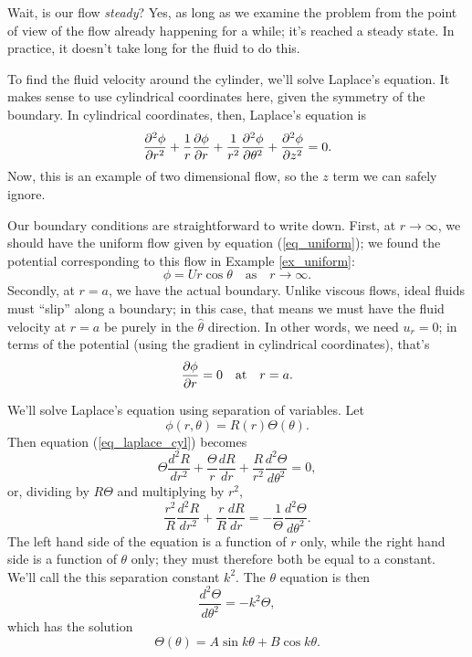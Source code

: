 Wait, is our flow \emph{steady}?  Yes, as long as we examine the problem from the point of view of the flow already happening for a while; it's reached a steady state.  In practice, it doesn't take long for the fluid to do this.

To find the fluid velocity around the cylinder, we'll solve Laplace's equation.  It makes sense to use cylindrical coordinates here, given the symmetry of the boundary.  In cylindrical coordinates, then, Laplace's equation is
\begin{equation}
\label{eq_laplace_cyl}
\frac{\partial^2 {\phi}}{\partial {r}^2} + \frac{1}{r} \frac{\partial {\phi}}{\partial {r}} + \frac{1}{r^2} \frac{\partial^2 {\phi}}{\partial {\theta}^2} + \frac{\partial^2 {\phi}}{\partial {z}^2} = 0.
\end{equation}
Now, this is an example of two dimensional flow, so the $z$ term we can safely ignore.

Our boundary conditions are straightforward to write down.  First, at $r \to \infty$, we should have the uniform flow given by equation (\ref{eq_uniform}); we found the potential corresponding to this flow in Example \ref{ex_uniform}:
\begin{equation}
\label{eq_cyl_bc1}
\phi = Ur \cos \theta \quad  \text{as} \quad r \to \infty.
\end{equation}
Secondly, at $r=a$, we have the actual boundary.  Unlike viscous flows, ideal fluids must ``slip'' along a boundary; in this case, that means we must have the fluid velocity at $r=a$ be purely in the $\hat{\theta}$ direction.  In other words, we need $u_r = 0$; in terms of the potential (using the gradient in cylindrical coordinates), that's
\begin{equation}
\label{eq_cyl_bc2}
\frac{\partial {\phi}}{\partial {r}} = 0 \quad \text{at} \quad r=a.
\end{equation}

We'll solve Laplace's equation using separation of variables.  Let
\[
\phi(r, \theta) = R(r) \Theta(\theta).
\]
Then equation (\ref{eq_laplace_cyl}) becomes
\[
\Theta \frac{d^2R}{dr^2} + \frac{\Theta}{r} \frac{dR}{dr} + \frac{R}{r^2} \frac{d^2 \Theta}{d\theta^2} = 0,
\]
or, dividing by $R\Theta$ and multiplying by $r^2$,
\begin{equation}
\label{eq_cyl_sep}
\frac{r^2}{R} \frac{d^2R}{dr^2} + \frac{r}{R} \frac{dR}{dr} = -\frac{1}{\Theta} \frac{d^2 \Theta}{d \theta^2}.
\end{equation}
The left hand side of the equation is a function of $r$ only, while the right hand side is a function of $\theta$ only; they must therefore both be equal to a constant.  We'll call the this separation constant $k^2$.  The $\theta$ equation is then
\[
\frac{d^2 \Theta}{d\theta^2} = -k^2 \Theta,
\]
which has the solution
\[
\Theta (\theta) = A \sin k\theta + B \cos k\theta.
\]

